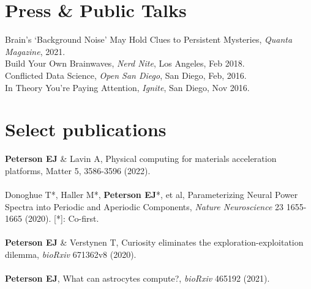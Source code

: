 \documentclass[margin,line]{res}
\begin{document}
\begin{resume}

\vspace{-.2cm}
\section{\sc Press \& Public Talks}
Brain's `Background Noise' May Hold Clues to Persistent Mysteries, \emph{Quanta Magazine}, 2021. \\
Build Your Own Brainwaves, \emph{Nerd Nite}, Los Angeles, Feb 2018. \\
Conflicted Data Science, \emph{Open San Diego}, San Diego, Feb, 2016. \\
In Theory You're Paying Attention, \emph{Ignite}, San Diego, Nov 2016. \\
    
\vspace{-.5cm} 
\section{\sc Select publications}
\textbf{Peterson EJ} \& Lavin A, Physical computing for materials acceleration platforms, Matter 5, 3586-3596 (2022).
\\ 
\vspace{-.35cm} 
\\
Donoghue T*, Haller M*, \textbf{Peterson EJ}*, et al, Parameterizing Neural Power Spectra into Periodic and Aperiodic Components, \emph{Nature Neuroscience} 23 1655-1665 (2020). [*]: Co-first. 
\\ 
\vspace{-.35cm} 
\\
\textbf{Peterson EJ} \& Verstynen T, Curiosity eliminates the exploration-exploitation dilemma, \emph{bioRxiv} 671362v8 (2020). 
\\ 
\vspace{-.35cm} 
\\
\textbf{Peterson EJ}, What can astrocytes compute?, \emph{bioRxiv} 465192 (2021).

\end{resume}
\end{document}
